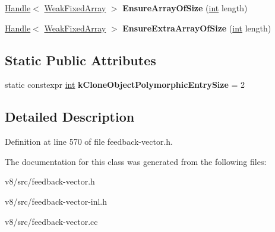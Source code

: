 \begin{DoxyCompactItemize}
\item 
\mbox{\label{classv8_1_1internal_1_1FeedbackNexus_af7617c7ae056742065e3c2a5d6159db2}} 
\mbox{\hyperlink{classv8_1_1internal_1_1Handle}{Handle}}$<$ \mbox{\hyperlink{classv8_1_1internal_1_1WeakFixedArray}{Weak\+Fixed\+Array}} $>$ {\bfseries Ensure\+Array\+Of\+Size} (\mbox{\hyperlink{classint}{int}} length)
\item 
\mbox{\label{classv8_1_1internal_1_1FeedbackNexus_a12da976c8bb809c3fa6b0e6dbcb33998}} 
\mbox{\hyperlink{classv8_1_1internal_1_1Handle}{Handle}}$<$ \mbox{\hyperlink{classv8_1_1internal_1_1WeakFixedArray}{Weak\+Fixed\+Array}} $>$ {\bfseries Ensure\+Extra\+Array\+Of\+Size} (\mbox{\hyperlink{classint}{int}} length)
\end{DoxyCompactItemize}
\subsection*{Static Public Attributes}
\begin{DoxyCompactItemize}
\item 
\mbox{\label{classv8_1_1internal_1_1FeedbackNexus_ad93e024d0b38e95e593b8db2256ad0db}} 
static constexpr \mbox{\hyperlink{classint}{int}} {\bfseries k\+Clone\+Object\+Polymorphic\+Entry\+Size} = 2
\end{DoxyCompactItemize}


\subsection{Detailed Description}


Definition at line 570 of file feedback-\/vector.\+h.



The documentation for this class was generated from the following files\+:\begin{DoxyCompactItemize}
\item 
v8/src/feedback-\/vector.\+h\item 
v8/src/feedback-\/vector-\/inl.\+h\item 
v8/src/feedback-\/vector.\+cc\end{DoxyCompactItemize}
